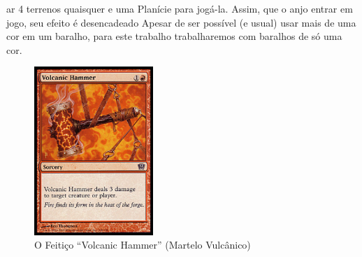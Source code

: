 ar 4 terrenos quaisquer e uma Planície para jogá-la. Assim, que o anjo entrar em jogo, seu efeito é desencadeado Apesar de ser possível (e usual) usar mais de uma cor em um baralho, para este trabalho trabalharemos com baralhos de só uma cor.

\begin{figure}[!h]
  \centering
  \includegraphics[width=0.4\textwidth]{picstcc/volcanicfull.png}
  \caption{O Feitiço ``Volcanic Hammer'' (Martelo Vulcânico)}
  \label{volcanicsorcery}
\end{figure}

